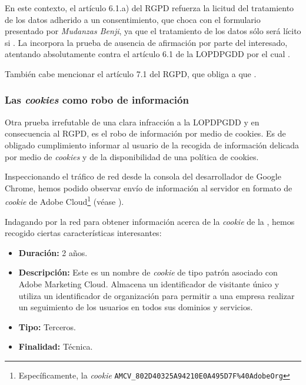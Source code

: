 En este contexto, el artículo 6.1.a) del RGPD refuerza la licitud del tratamiento de los datos adherido a un consentimiento, que choca con el formulario presentado por \textit{Mudanzas Benji}, ya que el tratamiento de los datos sólo será lícito si . La  incorpora la prueba de ausencia de afirmación por parte del interesado, atentando absolutamente contra el artículo 6.1 de la LOPDPGDD por el cual .


También cabe mencionar el artículo 7.1 del RGPD, que obliga a que .



\subsubsection{Las \textit{cookies} como robo de información}
Otra prueba irrefutable de una clara infracción a la LOPDPGDD y en consecuencia al RGPD, es el robo de información por medio de cookies. Es de obligado cumplimiento informar al usuario de la recogida de información delicada por medio de \textit{cookies} y de la disponibilidad de una política de cookies.

Inspeccionando el tráfico de red desde la consola del desarrollador de Google Chrome, hemos podido observar envío de información al servidor en formato de \textit{cookie} de Adobe Cloud\footnote{Específicamente, la \textit{cookie} \texttt{AMCV\_802D40325A94210E0A495D7F\%40AdobeOrg}} (véase ).


Indagando por la red para obtener información acerca de la \textit{cookie} de la , hemos recogido ciertas características interesantes:
\begin{itemize}
    \item \textbf{Duración:} 2 años.
    \item \textbf{Descripción:} Este es un nombre de \textit{cookie} de tipo patrón asociado con Adobe Marketing Cloud. Almacena un identificador de visitante único y utiliza un identificador de organización para permitir a una empresa realizar un seguimiento de los usuarios en todos sus dominios y servicios.
    \item \textbf{Tipo:} Terceros.
    \item \textbf{Finalidad:} Técnica.
\end{itemize}

